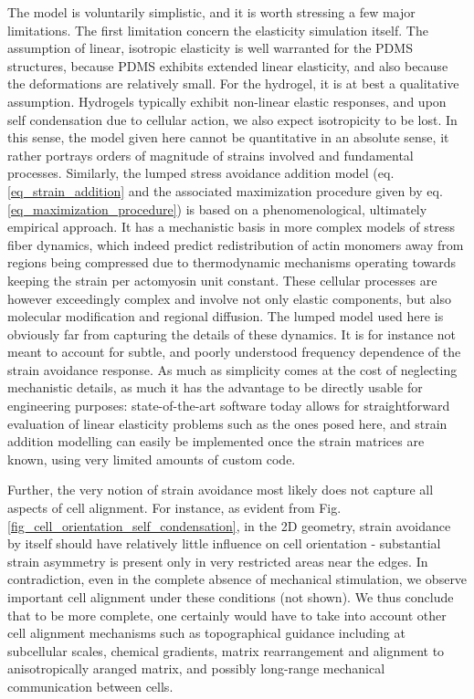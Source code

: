 \documentclass[11pt]{amsart}
\begin{document}
The model is voluntarily simplistic, and it is worth stressing a few major limitations. The first limitation concern the elasticity simulation itself. The assumption of linear, isotropic elasticity is well warranted for the PDMS structures, because PDMS exhibits extended linear elasticity, and also because the deformations are relatively small. For the hydrogel, it is at best a qualitative assumption. Hydrogels typically exhibit non-linear elastic responses, and upon self condensation due to cellular action, we also expect isotropicity to be lost. In this sense, the model given here cannot be quantitative in an absolute sense, it rather portrays orders of magnitude of strains involved and fundamental processes. Similarly, the lumped stress avoidance addition model (eq. \ref{eq_strain_addition} and the associated maximization procedure given by eq. \ref{eq_maximization_procedure}) is based on a phenomenological, ultimately empirical approach. It has a  mechanistic basis in more complex models of stress fiber dynamics, which indeed predict redistribution of actin monomers away from regions being compressed due to thermodynamic mechanisms operating towards keeping the strain per actomyosin unit constant\cite{chen_role_2018}. These cellular processes are however exceedingly complex and involve not only elastic components, but also molecular modification and regional diffusion\cite{vigliotti_thermodynamically_2016}. The lumped model used here is obviously far from capturing the details of these dynamics. It is for instance not meant to account for  subtle, and poorly understood frequency dependence of the strain avoidance response\cite{chen_role_2018}. As much as simplicity comes at the cost of neglecting mechanistic details, as much it has the advantage to be directly usable for engineering purposes: state-of-the-art software today allows for straightforward evaluation of linear elasticity problems such as the ones posed here, and strain addition modelling can easily be implemented once the strain matrices are known, using very limited amounts of custom code.

Further, the very notion of strain avoidance most likely does not capture all aspects of cell alignment. For instance, as evident from Fig. \ref{fig_cell_orientation_self_condensation}, in the 2D geometry, strain avoidance by itself should have relatively little influence on cell orientation - substantial strain asymmetry is present only in very restricted areas near the edges. In contradiction, even in the complete absence of mechanical stimulation, we observe important cell alignment under these conditions (not shown). We thus conclude that to be more complete, one certainly would have to take into account other cell alignment mechanisms such as topographical guidance including at subcellular scales\cite{leclech_cellular_2020}, chemical gradients\cite{wu_modeling_2011}, matrix rearrangement and alignment to anisotropically aranged matrix\cite{bourget_alignment_2013}, and possibly long-range mechanical communication between cells\cite{humphries_mechanical_2017}.
\end{document}
